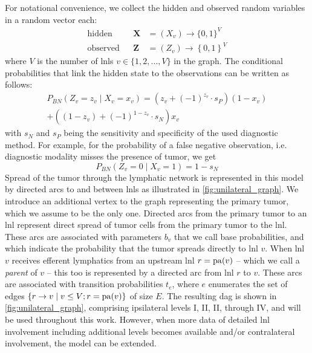 \documentclass[../ms.tex]{subfiles}
\begin{document}
For notational convenience, we collect the hidden and observed random variables in a random vector each:
%
\begin{equation}
    \begin{aligned}
        \text{hidden}& & \mathbf{X} &= ( X_v ) \rightarrow \{ 0,1 \}^V \\
        \text{observed}& & \mathbf{Z} &= ( Z_v ) \rightarrow \left\{ 0, 1 \right\}^V
    \end{aligned}
\end{equation}
%
where $V$ is the number of \glspl{lnl} $v \in \{ 1,2,\ldots,V \}$ in the graph. The conditional probabilities that link the hidden state to the observations can be written as follows:
%
\begin{multline}
    P_{BN} \left( Z_v = z_v \mid X_v = x_v \right) = \left( z_v + (-1)^{z_v} \cdot s_P \right)(1 - x_v) \\ 
    + \left( (1 - z_v) + (-1)^{1 - z_v} \cdot s_N \right) x_v
\end{multline}
%
with $s_N$ and $s_P$ being the sensitivity and specificity of the used diagnostic method. For example, for the probability of a false negative observation, i.e. diagnostic modality misses the presence of tumor, we get
%
\begin{equation}
    P_{BN} \left( Z_v = 0 \mid X_v = 1 \right) = 1 - s_N
\end{equation}
%
Spread of the tumor through the lymphatic network is represented in this model by directed arcs to and between \glspl{lnl} as illustrated in \cref{fig:unilateral_graph}. We introduce an additional vertex to the graph representing the primary tumor, which we assume to be the only one. Directed arcs from the primary tumor to an \gls{lnl} represent direct spread of tumor cells from the primary tumor to the \gls{lnl}. These arcs are associated with parameters $b_v$ that we call base probabilities, and which indicate the probability that the tumor spreads directly to \gls{lnl} $v$. When \gls{lnl} $v$ receives efferent lymphatics from an upstream \gls{lnl} $r = \operatorname{pa}(v)$ -- which we call a \emph{parent} of $v$ -- this too is represented by a directed arc from \gls{lnl} $r$ to $v$. These arcs are associated with transition probabilities $t_e$, where $e$ enumerates the set of edges $\left\{ r \rightarrow v \mid v \leq V ; r = \operatorname{pa}(v) \right\}$ of size $E$. The resulting \gls{dag} is shown in \cref{fig:unilateral_graph}, comprising ipsilateral levels I, II, II, through IV, and will be used throughout this work. However, when more data of detailed \gls{lnl} involvement including additional levels becomes available and/or contralateral involvement, the model can be extended.
\end{document}
